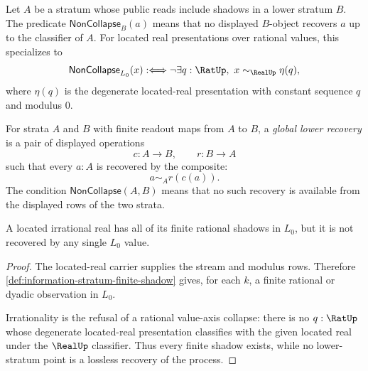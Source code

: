 \begin{definition}
\label{def:information-stratum-noncollapse}
Let $A$ be a stratum whose public reads include shadows in a lower stratum
$B$.  The predicate $\mathsf{NonCollapse}_B(a)$ means that no displayed
$B$-object recovers $a$ up to the classifier of $A$.  For located real
presentations over rational values, this specializes to
$$
\mathsf{NonCollapse}_{L_0}(x)
:\Longleftrightarrow
\neg\exists q:\RatUp,\ x\sim_{\RealUp}\eta(q),
$$
where $\eta(q)$ is the degenerate located-real presentation with constant
sequence $q$ and modulus $0$.
\end{definition}

\begin{definition}
\label{def:information-stratum-no-global-lower-recovery}
For strata $A$ and $B$ with finite readout maps from $A$ to $B$, a
\emph{global lower recovery} is a pair of displayed operations
$$
c:A\to B,
\qquad
r:B\to A
$$
such that every $a:A$ is recovered by the composite:
$$
a\sim_A r(c(a)).
$$
The condition $\mathsf{NonCollapse}(A,B)$ means that no such recovery is
available from the displayed rows of the two strata.
\end{definition}

\begin{theorem}
\label{thm:located-irrationality-process-noncollapse}
A located irrational real has all of its finite rational shadows in $L_0$,
but it is not recovered by any single $L_0$ value.
\end{theorem}

\begin{proof}
The located-real carrier supplies the stream and modulus rows.  Therefore
\autoref{def:information-stratum-finite-shadow} gives, for each $k$, a finite
rational or dyadic observation in $L_0$.

Irrationality is the refusal of a rational value-axis collapse: there is no
$q:\RatUp$ whose degenerate located-real presentation classifies with the
given located real under the $\RealUp$ classifier.  Thus every finite shadow
exists, while no lower-stratum point is a lossless recovery of the process.
\end{proof}

